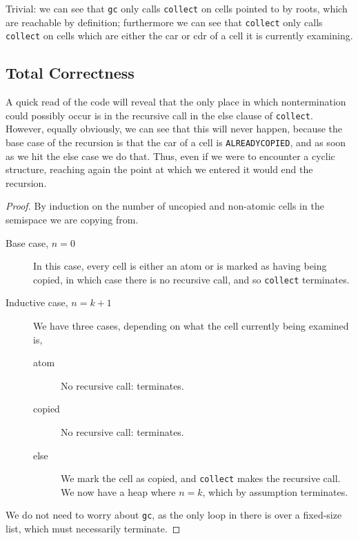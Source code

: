 \begin{lemma}
  \label{lem:c-example-unreach}
  Trivial: we can see that \texttt{gc} only calls \texttt{collect} on
  cells pointed to by roots, which are reachable by definition;
  furthermore we can see that \texttt{collect} only calls
  \texttt{collect} on cells which are either the car or cdr of a cell
  it is currently examining.
\end{lemma}

\subsection{Total Correctness}
\label{sec:copying-example-total}

A quick read of the code will reveal that the only place in which
nontermination could possibly occur is in the recursive call in the
else clause of \texttt{collect}. However, equally obviously, we can
see that this will never happen, because the base case of the
recursion is that the car of a cell is \texttt{ALREADYCOPIED}, and as
soon as we hit the else case we do that. Thus, even if we were to
encounter a cyclic structure, reaching again the point at which we
entered it would end the recursion.

\begin{proof}
  By induction on the number of uncopied and non-atomic cells in the
  semispace we are copying from.

  \begin{description}
  \item[Base case, $n = 0$] In this case, every cell is either an atom
    or is marked as having being copied, in which case there is no
    recursive call, and so \texttt{collect} terminates.

  \item[Inductive case, $n = k + 1$] We have three cases, depending on
    what the cell currently being examined is,

    \begin{description}
    \item[atom] No recursive call: terminates.
    \item[copied] No recursive call: terminates.
    \item[else] We mark the cell as copied, and \texttt{collect} makes
      the recursive call. We now have a heap where $n = k$, which by
      assumption terminates.
    \end{description}
  \end{description}

  We do not need to worry about \texttt{gc}, as the only loop in there
  is over a fixed-size list, which must necessarily terminate.
\end{proof}

